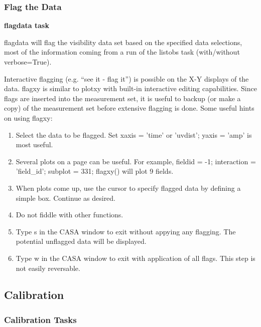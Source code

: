 \subsubsection{Flag the Data}
\label{subsubsection:flag.data}

\noindent
{\bf flagdata task}

flagdata will flag the visibility data set based on the specified data
selections, most of the information coming from a run of the listobs
task (with/without verbose=True). 
 
\vspace{3mm}

Interactive flagging (e.g. ``see it - flag it'') is possible on the
X-Y displays of the data. flagxy is similar to plotxy with built-in
interactive editing capabilities. Since flags are inserted into the
measurement set, it is useful to backup (or make a copy) of the
measurement set before extensive flagging is done. Some useful hints
on using flagxy: 

\begin{enumerate}
   \item Select the data to be flagged. Set xaxis = 'time' or
     'uvdist'; yaxis = 'amp' is most useful.  
   \item Several plots on a page can be useful. For example, fieldid =
     -1; interaction = 'field\_id';  subplot = 331; flagxy() will
     plot 9 fields. 
   \item When plots come up, use the cursor to specify flagged data by
     defining a simple box. Continue as desired.
   \item Do not fiddle with other functions. 
   \item Type s in the CASA window to exit without appying any
     flagging. The potential unflagged data will be displayed.
   \item Type w in the CASA window to exit with application of all
     flags. This step is not easily reversable.
\end{enumerate}

\subsection{Calibration}
\label{subsection:calib}

\subsubsection{Calibration Tasks}
\label{subsubsection:calib.tasks}

